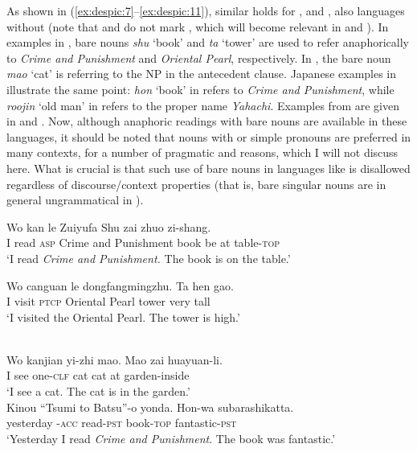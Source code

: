 \documentclass[output=paper,
modfonts
]{langscibook}
\begin{document}
	
	As shown in (\ref{ex:despic:7}--\ref{ex:despic:11}), similar holds for ,  and , also languages without  (note that  and  do not mark , which will become relevant in   and ). In  examples in , bare nouns \textit{shu} `book' and \textit{ta} `tower' are used to refer anaphorically to \textit{Crime and Punishment} and \textit{Oriental Pearl}, respectively. In , the bare noun \textit{mao} `cat' is referring to the NP in the antecedent clause. Japanese examples in  illustrate the same point: \textit{hon} `book' in  refers to \textit{Crime and Punishment}, while \textit{roojin} `old man' in  refers to the proper name \textit{Yahachi}. Examples from  are given in  and . Now, although anaphoric readings with bare nouns are available in these languages, it should be noted that nouns with  or simple pronouns are preferred in many contexts, for a number of pragmatic and  reasons, which I will not discuss here. What is crucial is that such use of bare nouns in languages like  is disallowed regardless of discourse/context properties (that is, bare singular nouns are in general ungrammatical in ).
	
	
	\ea \label{ex:despic:7} 
	\ea \label{ex:despic:7a}
	\gll 
	{Wo} {kan} {le} {Zuiyufa} {Shu} {zai} {zhuo} {zi-shang.} \\
	I read \textsc{asp} {Crime and Punishment} book be at table-\textsc{top} \\
	\glt `I read \textit{Crime and Punishment.} The book is on the table.'
	
	\ex \label{ex:despic:7b}
	\gll 
	{Wo} {canguan} {le} {dongfangmingzhu}. {Ta} {hen} {gao.} \\
	I visit \textsc{ptcp} {Oriental Pearl} tower very tall \\
	\glt `I visited the Oriental Pearl. The tower is high.'
	\z 
	\z\vspace{-.5\baselineskip}
	
	\ea \label{ex:despic:8}
	 \\
	\gll 
	{Wo} {kanjian} {yi-zhi} {mao}. {Mao} {zai} {huayuan-li.} \\
	I see one-\textsc{clf} cat cat at garden-inside \\ 
	\glt `I see a cat. The cat is in the garden.' \citep[403]{Dayal2004}  
	\z\vspace{-.5\baselineskip} 
	\largerpage
	\ea \label{ex:despic:9}
	 \\
	\ea \label{ex:despic:9a}
	\gll
	{Kinou} {``Tsumi to Batsu''-o} {yonda}. {Hon-wa} {subarashikatta}. \\
	yesterday \phantom{``}{Crime and Punishment}-\textsc{acc} read-\textsc{pst} book-\textsc{top} fantastic-\textsc{pst} \\ 
	\glt `Yesterday I read \textit{Crime and Punishment}. The book was fantastic.' 
	
\end{document}
